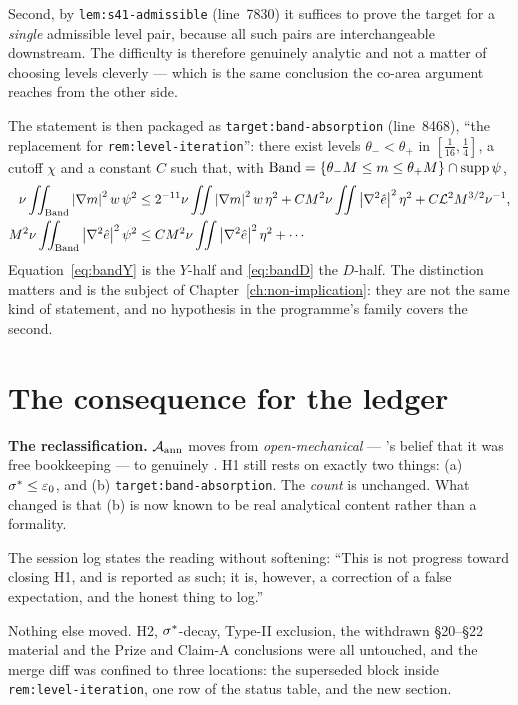 Second, by \texttt{lem:s41-admissible} (line~7830) it suffices to prove the
target for a \emph{single} admissible level pair, because all such pairs are
interchangeable downstream. The difficulty is therefore genuinely analytic and
not a matter of choosing levels cleverly --- which is the same conclusion the
co-area argument reaches from the other side.

The statement is then packaged as \texttt{target:band-absorption} (line~8468),
``the replacement for \texttt{rem:level-iteration}'': there exist levels
\(\theta_-<\theta_+\) in \([\tfrac1{16},\tfrac14]\), a cutoff \(\chi\) and a
constant \(C\) such that, with \(\mathrm{Band}=\{\theta_-M\le m\le\theta_+M\}\cap\operatorname{supp}\psi\),
\begin{align}
  \nu\iint_{\mathrm{Band}}\left|\nabla m\right|^2w\,\psi^2
    &\le 2^{-11}\nu\iint\left|\nabla m\right|^2w\,\eta^2
      + CM^2\nu\iint\left|\nabla^2\hat{e}\right|^2\eta^2
      + C\mathcal{L}^2M^{3/2}\nu^{-1},
      \label{eq:bandY}\\
  M^2\nu\iint_{\mathrm{Band}}\left|\nabla^2\hat{e}\right|^2\psi^2
    &\le CM^2\nu\iint\left|\nabla^2\hat{e}\right|^2\eta^2 + \cdots
      \label{eq:bandD}
\end{align}
Equation~\eqref{eq:bandY} is the \(Y\)-half and \eqref{eq:bandD} the
\(D\)-half. The distinction matters and is the subject of
Chapter~\ref{ch:non-implication}: they are not the same kind of statement, and
no hypothesis in the programme's family covers the second.

\section{The consequence for the ledger}
\label{sec:s41-ledger}

\begin{record}
\textbf{The reclassification.} \(\mathcal{A}_{\mathrm{ann}}\) moves from \emph{open-mechanical}
--- 's belief that it was free bookkeeping --- to genuinely \OPEN{}.
H1 still rests on exactly two things: (a) \(\sigma^{*}\le\varepsilon_0\), and
(b) \texttt{target:band-absorption}. The \emph{count} is unchanged. What
changed is that (b) is now known to be real analytical content rather than a
formality.

\smallskip
The session log states the reading without softening: ``This is not progress
toward closing H1, and is reported as such; it is, however, a correction of a
false expectation, and the honest thing to log.''
\end{record}

Nothing else moved. H2, \(\sigma^{*}\)-decay, Type-II exclusion, the withdrawn
\S20--\S22 material and the Prize and Claim-A conclusions were all untouched,
and the merge diff was confined to three locations: the superseded block
inside \texttt{rem:level-iteration}, one row of the  status table, and
the new section.

